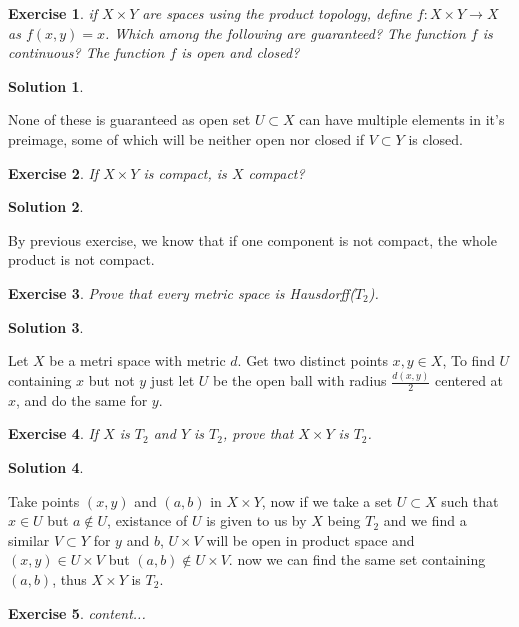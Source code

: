 \documentclass[11pt,a4paper]{article}
\newtheorem{Ex}{Exercise}
\newtheorem{Sol}{Solution}
\begin{document}
\begin{Ex}
	if $X \times Y$ are spaces using the product topology, define $f: X \times Y \rightarrow X$ as $f(x,y)=x$. Which among the following are guaranteed? The function $f$ is continuous? The function $f$ is open and closed? 
\end{Ex}
\begin{Sol}\end{Sol}
\noindent None of these is guaranteed as open set $U \subset X$ can have multiple elements in it's preimage, some of which will be neither open nor closed if $V \subset Y$ is closed. 

\begin{Ex}
If $X \times Y$ is compact, is $X$ compact?
\end{Ex}
\begin{Sol}\end{Sol}
\noindent By previous exercise, we know that if one component is not compact, the whole product is not compact.

\begin{Ex}
	Prove that every metric space is Hausdorff($T_2$).
\end{Ex}
\begin{Sol}\end{Sol}
Let $X$ be a metri space with metric $d$. Get two distinct points $x,y \in X$, To find $U$ containing $x$ but not $y$ just let $U$ be the open ball with radius $\frac{d(x,y)}{2}$ centered at $x$, and do the same for $y$. 

\begin{Ex}
	If $X$ is $T_2$ and $Y$ is $T_2$, prove that $X \times Y$ is $T_2$.
\end{Ex}
\begin{Sol}\end{Sol}
Take points $(x,y)$ and $(a,b)$ in $X \times Y$, now if we take a set $U \subset X$ such that $x \in U$ but $a \not \in U$, existance of $U$ is given to us by $X$ being $T_2$ and we find a similar $V \subset Y$ for $y$ and $b$, $U \times V$ will be open in product space and $(x,y) \in U \times V$ but $(a,b) \not \in U \times V$. now we can find the same set containing $(a,b)$, thus $X \times Y$ is $T_2$.

\begin{Ex}
	content...
\end{Ex}
\end{document}
